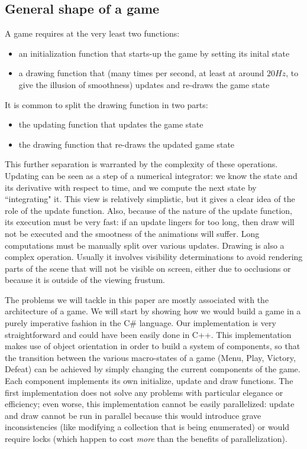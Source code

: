 \subsection{General shape of a game}
A game requires at the very least two functions:
\begin{itemize}
\item an initialization function that starts-up the game by setting its inital state
\item a drawing function that (many times per second, at least at around $20Hz$, to give the illusion of smoothness) updates and re-draws the game state
\end{itemize} 
It is common to split the drawing function in two parts:
\begin{itemize}
\item the updating function that updates the game state
\item the drawing function that re-draws the updated game state
\end{itemize}
This further separation is warranted by the complexity of these operations. Updating can be seen as a step of a numerical integrator: we know the state and its derivative with respect to time, and we compute the next state by ``integrating" it. This view is relatively simplistic, but it gives a clear idea of the role of the update function. Also, because of the nature of the update function, its execution must be very fast: if an update lingers for too long, then draw will not be executed and the smootness of the animations will suffer. Long computations must be manually split over various updates.
Drawing is also a complex operation. Usually it involves visibility determinations to avoid rendering parts of the scene that will not be visible on screen, either due to occlusions or because it is outside of the viewing frustum.

The problems we will tackle in this paper are mostly associated with the architecture of a game. We will start by showing how we would build a game in a purely imperative fashion in the C\# language. Our implementation is very straightforward and could have been easily done in C++. This implementation makes use of object orientation in order to build a system of components, so that the transition between the various macro-states of a game (Menu, Play, Victory, Defeat) can be achieved by simply changing the current components of the game. Each component implements its own initialize, update and draw functions. The first implementation does not solve any problems with particular elegance or efficiency; even worse, this implementation cannot be easily parallelized: update and draw cannot be run in parallel because this would introduce grave inconsistencies (like modifying a collection that is being enumerated) or would require locks (which happen to cost \textit{more} than the benefits of parallelization).

